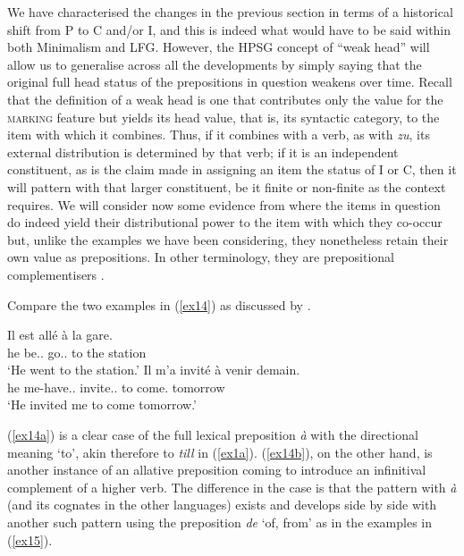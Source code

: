 \documentclass[output=paper]{langsci/langscibook}
\begin{document}
We have characterised the changes in the previous section in terms of a
historical shift from P to C and/or I, and this is indeed what would have to be
said within both Minimalism and \gls{LFG}. However, the \gls{HPSG} concept of
\enquote{weak head} will allow us to generalise across all the developments by
simply saying that the original full head status of the prepositions in
question weakens over time. Recall that the definition of a weak head is one
that contributes only the value for the \textsc{marking} feature but yields its
{\sc head} value, that is, its syntactic category, to the item with which it
combines. Thus, if it combines with a verb, as with  \emph{zu}, its
external distribution is determined by that verb; if it is an independent
constituent, as is the claim made in assigning an item the status of I or C,
then it will pattern with that larger constituent, be it finite or non-finite
as the context requires. We will consider now some evidence from  where
the items in question do indeed yield their distributional power to the item
with which they co-occur but, unlike the  examples we have been
considering, they nonetheless retain their own value as prepositions. In other
terminology, they are prepositional complementisers \citep{Kayne99, Borsley01}.

Compare the two  examples in (\ref{ex14}) as discussed by
\cite{Abeilleetal06}.

\begin{exe}
\ex\label{ex14} 
\begin{xlist}
\ex\label{ex14a}
\gll Il	est all\'e \`a la gare.\\	he be.\Prs.\Tsg{} go.\Pst.\Ptcp{} to the station\\\trans \enquote*{He went to the station.}
\ex\label{ex14b}
\gll Il m'a invit\'e \`a venir demain.\\	he me-have.\Prs.\Tsg{} invite.\Pst.\Ptcp{} to come.\Inf{} tomorrow\\\trans \enquote*{He invited me to come tomorrow.}
\end{xlist}
\end{exe}

(\ref{ex14a}) is a clear case of the full lexical preposition {\it\`a} with the
directional meaning `to', akin therefore to  \emph{till} in
(\ref{ex1a}). (\ref{ex14b}), on the other hand, is another instance of an
allative preposition coming to introduce an infinitival complement of a higher
verb. The difference in the  case is that the pattern with \emph{\`a}
(and its cognates in the other languages) exists and develops side by side with
another such pattern using the preposition \emph{de} `of, from' as in the
examples in (\ref{ex15}).\newpage
\end{document}

